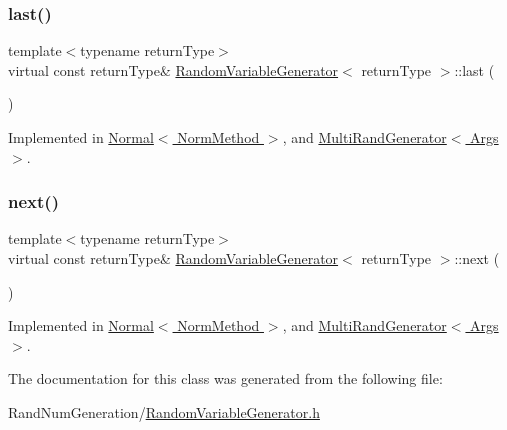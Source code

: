 \subsubsection{\texorpdfstring{last()}{last()}}
{\footnotesize\ttfamily template$<$typename return\+Type$>$ \\
virtual const return\+Type\& \hyperlink{class_random_variable_generator}{Random\+Variable\+Generator}$<$ return\+Type $>$\+::last (\begin{DoxyParamCaption}{ }\end{DoxyParamCaption})\hspace{0.3cm}{\ttfamily [pure virtual]}}



Implemented in \hyperlink{class_normal_a3f10787d08cb2479764d7e0da8256aa7}{Normal$<$ Norm\+Method $>$}, and \hyperlink{class_multi_rand_generator_abb83dee0545ca24fab2999144de6f0e3}{Multi\+Rand\+Generator$<$ Args $>$}.

\hypertarget{class_random_variable_generator_a5178e1f85eff432dffd6320767136836}{}\label{class_random_variable_generator_a5178e1f85eff432dffd6320767136836} 
\subsubsection{\texorpdfstring{next()}{next()}}
{\footnotesize\ttfamily template$<$typename return\+Type$>$ \\
virtual const return\+Type\& \hyperlink{class_random_variable_generator}{Random\+Variable\+Generator}$<$ return\+Type $>$\+::next (\begin{DoxyParamCaption}{ }\end{DoxyParamCaption})\hspace{0.3cm}{\ttfamily [pure virtual]}}



Implemented in \hyperlink{class_normal_a2cd9c31195181491a4bf0d3856746437}{Normal$<$ Norm\+Method $>$}, and \hyperlink{class_multi_rand_generator_a39838e440c70bb6de68052a2ea25e258}{Multi\+Rand\+Generator$<$ Args $>$}.



The documentation for this class was generated from the following file\+:\begin{DoxyCompactItemize}
\item 
Rand\+Num\+Generation/\hyperlink{_random_variable_generator_8h}{Random\+Variable\+Generator.\+h}\end{DoxyCompactItemize}
